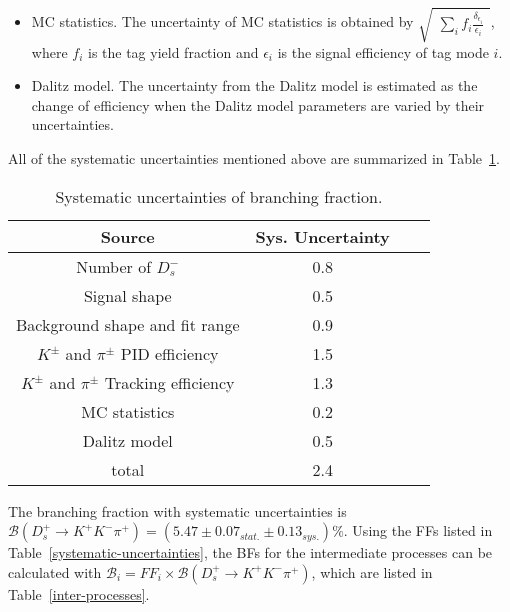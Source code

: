 {\begin{itemize}
        \item MC statistics. The uncertainty of MC statistics is obtained by $\sqrt{ \begin{matrix} \sum_{i} f_{i}\frac{\delta_{\epsilon_{i}}}{\epsilon_{i}}\end{matrix}}$, where $f_{i}$ is the tag yield fraction and $\epsilon_{i}$ is the signal efficiency of tag mode $i$.
        \item Dalitz model. The uncertainty from the Dalitz model is estimated as the change of efficiency when the Dalitz model parameters are varied by their uncertainties.
    \end{itemize}

    All of the systematic uncertainties mentioned above are summarized in Table~\ref{BF-Sys}.
    \begin{table}[htbp]
        \caption{Systematic uncertainties of branching fraction.}
        \label{BF-Sys}
        \begin{center}
            \begin{tabular}{cccc}
                \toprule\toprule
                Source   & Sys. Uncertainty\\
                \hline
                Number of $D_{s}^{-}$               & 0.8 \\
                Signal shape                        & 0.5 \\
                Background shape and fit range      & 0.9 \\
                $K^{\pm}$ and $\pi^{\pm}$ PID efficiency            & 1.5 \\
                $K^{\pm}$ and $\pi^{\pm}$ Tracking efficiency       & 1.3 \\
                MC statistics                       & 0.2 \\
                \hline
                Dalitz model                               & 0.5 \\
                \hline
                total                               & 2.4 \\
                \bottomrule\bottomrule
            \end{tabular}
        \end{center}
    \end{table}

    The branching fraction with systematic uncertainties is $\mathcal{B}(D_{s}^{+} \rightarrow K^{+}K^{-}\pi^{+})=(5.47\pm0.07_{stat.}\pm0.13_{sys.})\%$.
    Using the FFs listed in Table~\ref{systematic-uncertainties}, the BFs for the intermediate processes can be calculated with $\mathcal{B}_{i} = FF_{i} \times \mathcal{B}(D_{s}^{+} \rightarrow K^{+}K^{-}\pi^{+})$, which are listed in Table~\ref{inter-processes}.  
    
}
